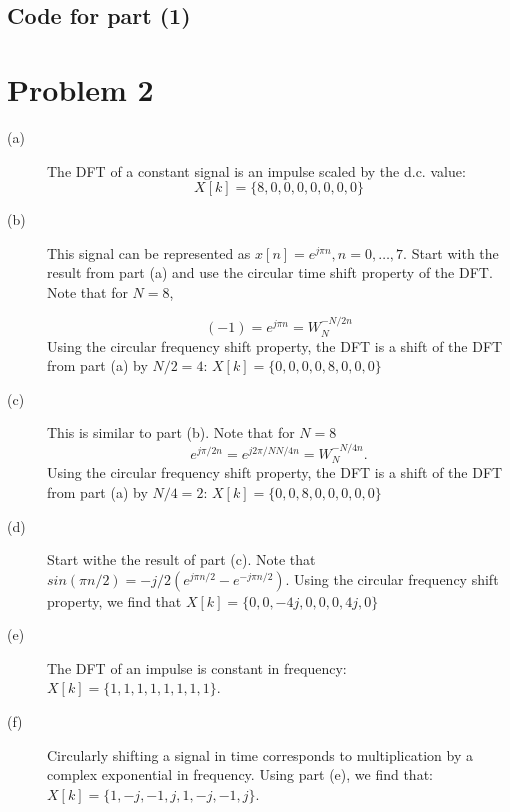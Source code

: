 \documentclass{article}
\begin{document}
\subsection{Code for part (1)}


\section{Problem 2}

\begin{description}
	\item[(a)] The DFT of a constant signal is an impulse scaled by the d.c. value: 
	\begin{equation}
		X[k] = \{8, 0, 0, 0, 0, 0, 0, 0\}
	\end{equation}
	
	\item[(b)] This signal can be represented as  $x[n] = e^{j\pi n}, n = 0, \ldots, 7$. Start with the result from part (a) and use the circular time shift property of the DFT. Note that for $N = 8$, 
	
	\begin{equation}
	(-1) = e^{j\pi n} = W_N^{-N/2n}
	\end{equation}
	Using the circular frequency shift property, the DFT is a shift of the DFT from part (a) by $N/2 = 4$: $X[k] = \{0, 0, 0, 0, 8, 0, 0, 0\}$
	
	\item[(c)] This is similar to part (b). Note that for $N = 8$
	\begin{equation}
	e^{j\pi/2n} = e^{j2\pi/N N/4n} = W_N^{-N/4n}.
	\end{equation}
	Using the circular frequency shift property, the DFT is a shift of the DFT from part (a) by $N/4 = 2$: $X[k] = \{0, 0, 8, 0, 0, 0, 0, 0\}$
	
	\item[(d)] Start withe the result of part (c). Note that $sin(\pi n/2) = -j/2(e^{j\pi n/2} - e^{-j\pi n/2})$. Using the circular frequency shift property, we find that $X[k] = \{0, 0, -4j, 0, 0, 0, 4j, 0\}$
	
	\item[(e)] The DFT of an impulse is constant in frequency: $X[k] = \{1, 1, 1, 1, 1, 1, 1, 1\}$.
	
	\item[(f)] Circularly shifting a signal in time corresponds to multiplication by a complex exponential in frequency. Using part (e), we find that: $X[k] = \{1, -j, -1, j, 1, -j, -1, j\}$.  
\end{description}
\end{document}
